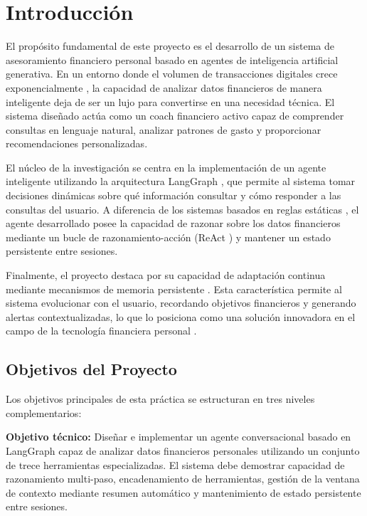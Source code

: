 \section{Introducción}
\label{sec:introduccion}

El propósito fundamental de este proyecto es el desarrollo de un sistema de asesoramiento financiero personal basado en agentes de inteligencia artificial generativa. En un entorno donde el volumen de transacciones digitales crece exponencialmente \cite{fintech2023}, la capacidad de analizar datos financieros de manera inteligente deja de ser un lujo para convertirse en una necesidad técnica. El sistema diseñado actúa como un coach financiero activo capaz de comprender consultas en lenguaje natural, analizar patrones de gasto y proporcionar recomendaciones personalizadas.

El núcleo de la investigación se centra en la implementación de un agente inteligente utilizando la arquitectura LangGraph \cite{langgraph2024}, que permite al sistema tomar decisiones dinámicas sobre qué información consultar y cómo responder a las consultas del usuario. A diferencia de los sistemas basados en reglas estáticas \cite{conversational_ai2023}, el agente desarrollado posee la capacidad de razonar sobre los datos financieros mediante un bucle de razonamiento-acción (ReAct \cite{react2022}) y mantener un estado persistente entre sesiones.

Finalmente, el proyecto destaca por su capacidad de adaptación continua mediante mecanismos de memoria persistente \cite{memory_in_agents2023}. Esta característica permite al sistema evolucionar con el usuario, recordando objetivos financieros y generando alertas contextualizadas, lo que lo posiciona como una solución innovadora en el campo de la tecnología financiera personal \cite{personal_finance_ai2024}.

\subsection{Objetivos del Proyecto}
\label{subsec:objetivos}

Los objetivos principales de esta práctica se estructuran en tres niveles complementarios:

\textbf{Objetivo técnico:} Diseñar e implementar un agente conversacional basado en LangGraph capaz de analizar datos financieros personales utilizando un conjunto de trece herramientas especializadas. El sistema debe demostrar capacidad de razonamiento multi-paso, encadenamiento de herramientas, gestión de la ventana de contexto mediante resumen automático y mantenimiento de estado persistente entre sesiones.

